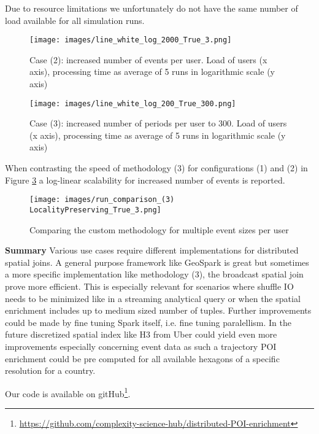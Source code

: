 \documentclass[conference]{IEEEtran}
\begin{document}
Due to resource limitations we unfortunately do not have the same number of load available for all simulation runs.
\begin{figure}%
\centerline{\texttt{[image: images/line\_white\_log\_2000\_True\_3.png]}}
\caption{Case (2): increased number of events per user. Load of users (x axis), processing time as average of 5 runs in logarithmic scale (y axis)}
\label{fig:more_events}
\end{figure}
\begin{figure}%
\centerline{\texttt{[image: images/line\_white\_log\_200\_True\_300.png]}}
\caption{Case (3): increased number of periods per user to 300. Load of users (x axis), processing time as average of 5 runs in logarithmic scale (y axis)}
\label{fig:more_periods}
\end{figure}
When contrasting the speed of methodology (3) for configurations (1) and (2) in Figure \ref{fig:_comparison} a log-linear scalability for increased number of events is reported.
\begin{figure}%
\centerline{\texttt{[image: images/run\_comparison\_(3) LocalityPreserving\_True\_3.png]}}
\caption{Comparing the custom methodology for multiple event sizes per user}
\label{fig:_comparison}
\end{figure}

\textbf{Summary}
Various use cases require different implementations for distributed spatial joins.
A general purpose framework like GeoSpark is great but sometimes a more specific implementation like methodology (3), the broadcast spatial join prove more efficient.
This is especially relevant for scenarios where shuffle IO needs to be minimized like in a streaming analytical query or when the  spatial enrichment includes up to medium sized number of tuples.
Further improvements could be made by fine tuning Spark itself, i.e. fine tuning paralellism.
In the future discretized spatial index like H3 from Uber\cite{uber_h3} could yield even more improvements especially concerning event data as such a trajectory POI enrichment could be pre computed for all available hexagons of a specific resolution for a country.


Our code is available on gitHub\footnote{\url{https://github.com/complexity-science-hub/distributed-POI-enrichment}}.

\printbibliography
\end{document}
